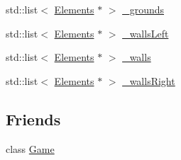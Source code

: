 \begin{DoxyCompactItemize}
\item 
std\-::list$<$ \hyperlink{class_elements}{Elements} $\ast$ $>$ \hyperlink{class_characters_a35ee6e0ded905f63112a08cd3ad76435}{\-\_\-grounds}
\item 
std\-::list$<$ \hyperlink{class_elements}{Elements} $\ast$ $>$ \hyperlink{class_characters_a7a12ea35974e9b9d5fce08b194c37df0}{\-\_\-walls\-Left}
\item 
std\-::list$<$ \hyperlink{class_elements}{Elements} $\ast$ $>$ \hyperlink{class_characters_af296e78457066933b426e1a1e950a9d4}{\-\_\-walls}
\item 
std\-::list$<$ \hyperlink{class_elements}{Elements} $\ast$ $>$ \hyperlink{class_characters_a60b4de9d954c3de8093bfce23e0e0cec}{\-\_\-walls\-Right}
\end{DoxyCompactItemize}
\subsection*{Friends}
\begin{DoxyCompactItemize}
\item 
class \hyperlink{class_characters_aa2fab026580d6f14280c2ffb8063a314}{Game}
\end{DoxyCompactItemize}


